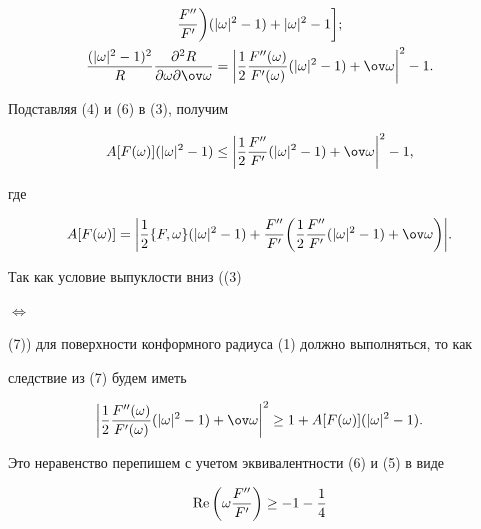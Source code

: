 \begin{pf}
\begin{gather}
\frac{F''}{F'}\bigg)(|\omega|^2-1)+|\omega|^2-1\bigg];\\ 


% 


\frac{(|\omega|^2-1)^2}{R} 


\frac{\partial^2R}{\partial\omega\partial\ov\omega}= 


\bigg|\frac{1}{2}\frac{F''(\omega)}{F'(\omega)} 


(|\omega|^2-1)+\ov\omega\bigg|^2-1. 


\end{gather} 


 


Подставляя (4) и (6) в (3), получим 


\begin{equation} 


A[F(\omega)](|\omega|^2-1)\le\bigg|\frac{1}{2} 


\frac{F''}{F'}(|\omega|^2-1)+\ov\omega\bigg|^2-1, 


\end{equation} 


где 


$$ 


A[F(\omega)]=\bigg|\frac{1}{2}\{F,\omega\}(|\omega|^2-1)+ 


\frac{F''}{F'}\bigg(\frac{1}{2}\frac{F''}{F'} 


(|\omega|^2-1)+\ov\omega\bigg)\bigg|. 


$$ 


 


Так как условие выпуклости вниз ((3) 


$\Longleftrightarrow$ 


(7)) для поверхности конформного радиуса (1) должно выполняться, то как 


следствие из (7) будем иметь 


$$ 


\bigg|\frac{1}{2}\frac{F''(\omega)}{F'(\omega)} 


(|\omega|^2-1)+\ov\omega\bigg|^2\ge 1+A[F(\omega)] 


(|\omega|^2-1). 


$$ 


Это неравенство перепишем с учетом эквивалентности (6) и (5) в виде 


\begin{equation} 


\re\bigg(\omega\frac{F''}{F'}\bigg)\ge-1-\frac{1}{4} 



\end{equation}
\end{pf}
